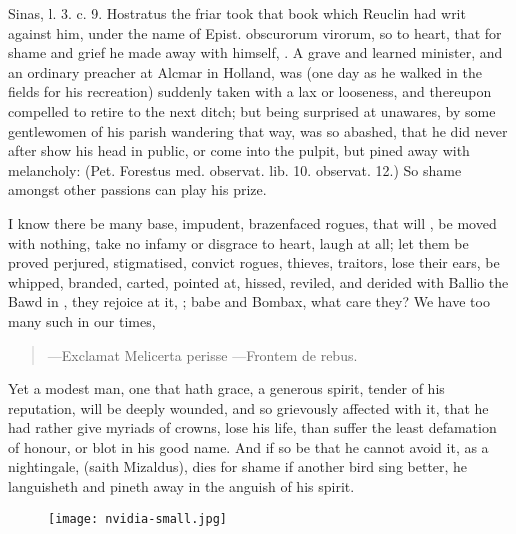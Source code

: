 {{Sinas, l. 3. c. 9. Hostratus the friar took that book which Reuclin had
writ against him, under the name of Epist. obscurorum virorum, so to
heart, that for shame and grief he made away with himself, . A grave and learned minister, and an ordinary preacher at
Alcmar in Holland, was (one day as he walked in the fields for his
recreation) suddenly taken with a lax or looseness, and thereupon
compelled to retire to the next ditch; but being surprised at
unawares, by some gentlewomen of his parish wandering that way, was so
abashed, that he did never after show his head in public, or come into
the pulpit, but pined away with melancholy: (Pet. Forestus med.
observat. lib. 10. observat. 12.) So shame amongst other passions can
play his prize.

I know there be many base, impudent, brazenfaced rogues, that will
 , be moved with nothing, take no infamy or
disgrace to heart, laugh at all; let them be proved perjured,
stigmatised, convict rogues, thieves, traitors, lose their ears, be
whipped, branded, carted, pointed at, hissed, reviled, and derided with
Ballio the Bawd in \Plautus{}, they rejoice at it, ;
babe and Bombax, what care they? We have too many such in our times,

\begin{latin}
\begin{quote}%
---Exclamat Melicerta perisse
---Frontem de rebus.
\end{quote}%
\end{latin}

Yet a modest man, one that hath grace, a generous spirit, tender of his
reputation, will be deeply wounded, and so grievously affected with it,
that he had rather give myriads of crowns, lose his life, than suffer
the least defamation of honour, or blot in his good name. And if so be
that he cannot avoid it, as a nightingale, 
(saith Mizaldus), dies for shame if another bird sing better, he
languisheth and pineth away in the anguish of his spirit.

\cleartoleftpage{}
\begin{figure}[p]
  \begingroup
  \centering
  \texttt{[image: nvidia-small.jpg]}
  \label{fig:invidia}
\end{figure}

}}
